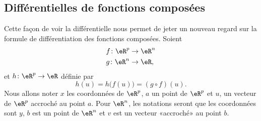 \subsection{Différentielles de fonctions composées}

Cette façon de voir la différentielle nous permet de jeter un nouveau regard sur la formule de différentiation des fonctions composées. Soient
\begin{equation}
    \begin{aligned}[]
        f\colon \eR^p&\to \eR^n\\
        g\colon \eR^n&\to \eR,
    \end{aligned}
\end{equation}
et $h\colon \eR^p\to \eR$ définie par 
\begin{equation}
    h(u)=h\big( f(u) \big)=(g\circ f)(u).
\end{equation}
Nous allons noter $x$ les coordonnées de $\eR^p$, $a$ un point de $\eR^p$ et $u$, un vecteur de $\eR^p$ accroché au point $a$. Pour $\eR^n$, les notations seront que les coordonnées sont $y$, $b$ est un point de $\eR^n$ et $v$ est un vecteur «accroché» au point $b$.

